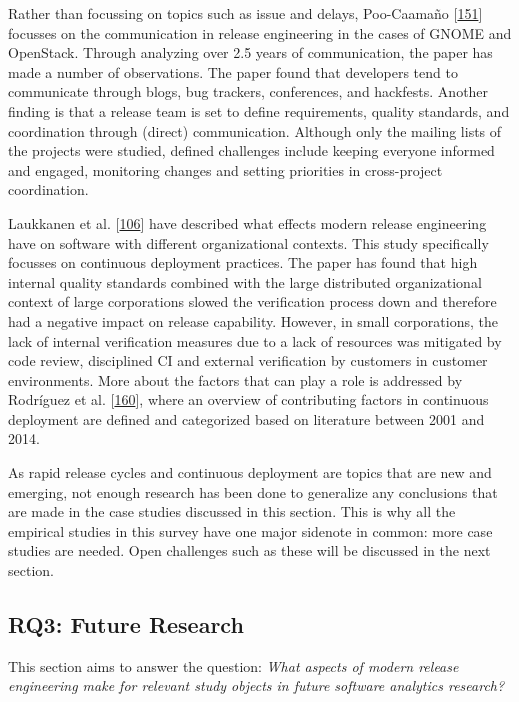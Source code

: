 \documentclass[]{book}
\begin{document}
Rather than focussing on topics such as issue and delays, Poo-Caamaño
{[}\protect\hyperlink{ref-poo-caamano2016a}{151}{]} focusses on the
communication in release engineering in the cases of GNOME and
OpenStack. Through analyzing over 2.5 years of communication, the paper
has made a number of observations. The paper found that developers tend
to communicate through blogs, bug trackers, conferences, and hackfests.
Another finding is that a release team is set to define requirements,
quality standards, and coordination through (direct) communication.
Although only the mailing lists of the projects were studied, defined
challenges include keeping everyone informed and engaged, monitoring
changes and setting priorities in cross-project coordination.

Laukkanen et al. {[}\protect\hyperlink{ref-laukkanen2018a}{106}{]} have
described what effects modern release engineering have on software with
different organizational contexts. This study specifically focusses on
continuous deployment practices. The paper has found that high internal
quality standards combined with the large distributed organizational
context of large corporations slowed the verification process down and
therefore had a negative impact on release capability. However, in small
corporations, the lack of internal verification measures due to a lack
of resources was mitigated by code review, disciplined CI and external
verification by customers in customer environments. More about the
factors that can play a role is addressed by Rodríguez et al.
{[}\protect\hyperlink{ref-rodriguez2017a}{160}{]}, where an overview of
contributing factors in continuous deployment are defined and
categorized based on literature between 2001 and 2014.

As rapid release cycles and continuous deployment are topics that are
new and emerging, not enough research has been done to generalize any
conclusions that are made in the case studies discussed in this section.
This is why all the empirical studies in this survey have one major
sidenote in common: more case studies are needed. Open challenges such
as these will be discussed in the next section.

\subsection{RQ3: Future Research}\label{rq3-future-research}

This section aims to answer the question: \emph{What aspects of modern
release engineering make for relevant study objects in future software
analytics research?}
\end{document}
